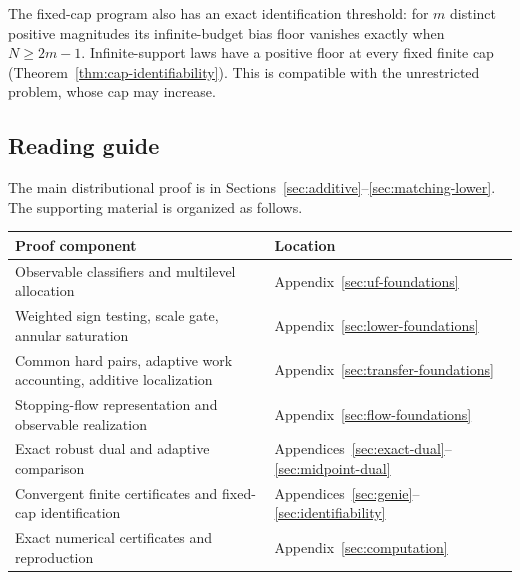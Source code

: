The fixed-cap program also has an exact identification threshold:
for $m$ distinct positive magnitudes its infinite-budget bias floor
vanishes exactly when $N\ge2m-1$. Infinite-support laws have a positive
floor at every fixed finite cap
(Theorem~\ref{thm:cap-identifiability}). This is compatible with the
unrestricted problem, whose cap may increase.

\subsection{Reading guide}

The main distributional proof is in
Sections~\ref{sec:additive}--\ref{sec:matching-lower}.
The supporting material is organized as follows.

\begin{center}
\small
\begin{tabularx}{\textwidth}{@{}p{}X@{}}
\toprule
Proof component & Location\\
\midrule
Observable classifiers and multilevel allocation
 & Appendix~\ref{sec:uf-foundations}\\
Weighted sign testing, scale gate, annular saturation
 & Appendix~\ref{sec:lower-foundations}\\
Common hard pairs, adaptive work accounting, additive localization
 & Appendix~\ref{sec:transfer-foundations}\\
Stopping-flow representation and observable realization
 & Appendix~\ref{sec:flow-foundations}\\
Exact robust dual and adaptive comparison
 & Appendices~\ref{sec:exact-dual}--\ref{sec:midpoint-dual}\\
Convergent finite certificates and fixed-cap identification
 & Appendices~\ref{sec:genie}--\ref{sec:identifiability}\\
Exact numerical certificates and reproduction
 & Appendix~\ref{sec:computation}\\
\bottomrule
\end{tabularx}
\end{center}
